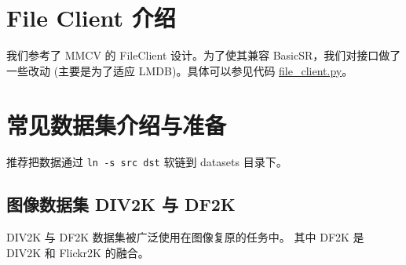 \documentclass[../main.tex]{subfiles}
\begin{document}
\section{File Client 介绍}\label{data_preparation:file_client}

我们参考了 MMCV 的 FileClient 设计。为了使其兼容 BasicSR，我们对接口做了一些改动 (主要是为了适应 LMDB)。具体可以参见代码 \href{https://github.com/XPixelGroup/BasicSR/blob/master/basicsr/utils/file_client.py}{file\_client.py}。


\section{常见数据集介绍与准备}\label{data_preparation:dataset}

推荐把数据通过 \texttt{ln -s src dst} 软链到 datasets 目录下。

\subsection{图像数据集 DIV2K 与 DF2K}

DIV2K 与 DF2K 数据集被广泛使用在图像复原的任务中。
其中 DF2K 是 DIV2K 和 Flickr2K 的融合。
\end{document}
